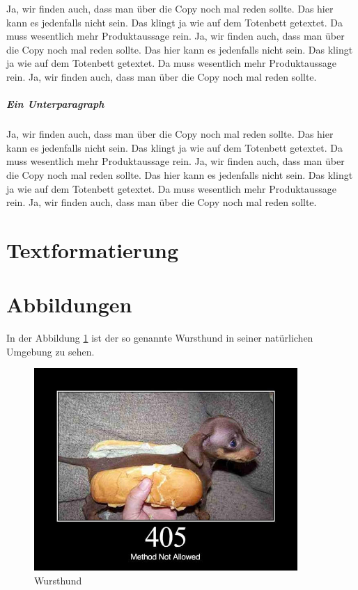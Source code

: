 Ja, wir finden auch, dass man über die Copy noch mal reden sollte. Das hier kann es jedenfalls nicht sein. Das klingt ja wie auf dem Totenbett getextet. Da muss wesentlich mehr Produktaussage rein. Ja, wir finden auch, dass man über die Copy noch mal reden sollte. Das hier kann es jedenfalls nicht sein. Das klingt ja wie auf dem Totenbett getextet. Da muss wesentlich mehr Produktaussage rein. Ja, wir finden auch, dass man über die Copy noch mal reden sollte.

\subparagraph{Ein Unterparagraph}

Ja, wir finden auch, dass man über die Copy noch mal reden sollte. Das hier kann es jedenfalls nicht sein. Das klingt ja wie auf dem Totenbett getextet. Da muss wesentlich mehr Produktaussage rein. Ja, wir finden auch, dass man über die Copy noch mal reden sollte. Das hier kann es jedenfalls nicht sein. Das klingt ja wie auf dem Totenbett getextet. Da muss wesentlich mehr Produktaussage rein. Ja, wir finden auch, dass man über die Copy noch mal reden sollte.

\section{Textformatierung}

\section{Abbildungen}

In der Abbildung \ref{fig:wursthund} ist der so genannte Wursthund in seiner natürlichen Umgebung zu sehen.

\begin{figure}[ht]
	\begin{center}
		\includegraphics[width=10cm]{bilder/wursthund.jpg}
	\end{center}
	\caption{Wursthund}
	\label{fig:wursthund}
\end{figure}

